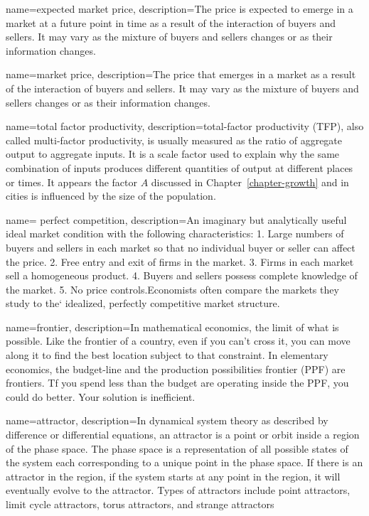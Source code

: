 {
name=expected market price,
description={The price is expected to emerge in a \gls{market} at a future point in time as a result of the interaction of buyers and sellers. It may vary as the mixture of buyers and sellers changes or as their information changes.}
}

{
name=market price,
description={The price that emerges in a \gls{market} as a result of the interaction of buyers and sellers. It may vary as the mixture of buyers and sellers changes or as their information changes.}
}




{
name=total factor productivity,
description={total-factor productivity (TFP), also called multi-factor productivity, is usually measured as the ratio of aggregate output  to aggregate inputs. It is a scale factor used to explain why the same combination of inputs produces different quantities of output at different places or times. It appears the factor  $A$ discussed in Chapter~\ref{chapter-growth} and in cities is influenced by the size of the population.  }
}

{
name= perfect competition,
description={An imaginary but analytically useful ideal market condition with the following  characteristics: 1. Large numbers of buyers and sellers in each market so that no individual buyer or seller can affect the price. 2. Free entry and exit of firms in the market. 3. Firms in each market sell a homogeneous product. 4. Buyers and sellers possess complete knowledge of the market. 5. No price controls.\newline  Economists often compare the markets they study to the` idealized, perfectly competitive market structure.}
}

{
name=frontier,
description={In mathematical economics, the limit of what is possible. Like the frontier of a country, even if you can't cross it, you can move along it to find the best location  subject to that constraint. In elementary economics, the budget-line and the production possibilities frontier (PPF) are  frontiers. Tf you spend less than the budget are operating inside the PPF, you could do better. Your solution is inefficient. }
}

{
name=attractor,
description={In \gls{dynamical system} theory as described by difference or differential equations, an attractor is a point or orbit inside a region of the phase space. The phase space is a representation of all possible states of the system each corresponding to a unique point in the phase space. If there is an attractor in the region, if the system starts at any point in the region, it will eventually evolve to the attractor. Types of attractors include point attractors, limit cycle attractors, torus attractors, and strange attractors}
}

